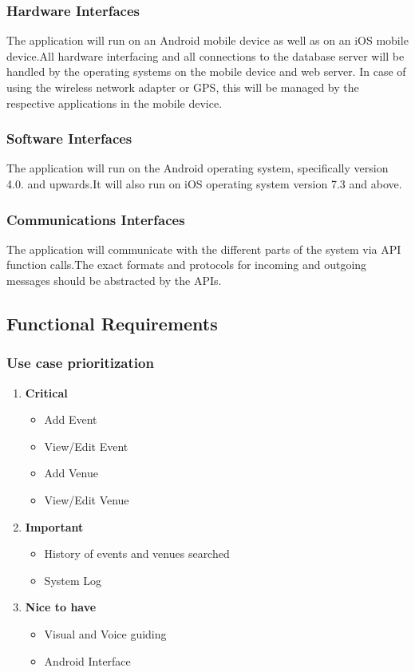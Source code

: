 \documentclass[a4paper,10pt]{article}
\begin{document}
                 \subsubsection{Hardware Interfaces}
The application will run on an Android mobile device as well as on an iOS mobile device.All hardware interfacing and all connections to the database server will be handled by the operating systems on the mobile device and web server. In case of using the wireless network adapter or GPS, this will be managed by the respective applications in the mobile device.

                 \subsubsection{Software Interfaces}
The application will run on the Android operating system, specifically version 4.0. and upwards.It will also run on iOS operating system version 7.3 and above.

                 \subsubsection{Communications Interfaces}
The application will communicate with the different parts of the system via API function calls.The exact formats and protocols for incoming and outgoing messages should be abstracted by the APIs.

	\subsection{Functional Requirements}
	\subsubsection{Use case prioritization} 
		\begin{enumerate} 
		\item \textbf{Critical} 
			\begin{itemize} 
				\item Add Event 
				\item View/Edit Event 
				\item Add Venue 
				\item View/Edit Venue 
			\end{itemize} 
		\item \textbf{Important} 
			\begin{itemize} 
				\item History of events and venues searched 
				\item System Log 
			\end{itemize} 
		\item \textbf{Nice to have} 
			\begin{itemize} 
				\item Visual and Voice guiding 
				\item Android Interface 
			\end{itemize} 
		\end{enumerate} 
		
\end{document}
